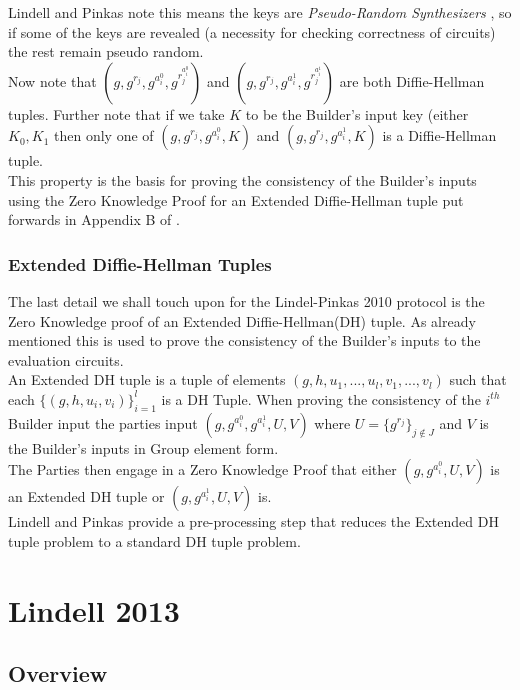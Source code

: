 \documentclass[ %
                    author={Nicholas Tutte},
                supervisor={Prof. Nigel Smart},
                    degree={MEng},
                     title={Secure Two Party Computation},
                  subtitle={A practical comparison of recent protocols},
                      type={Research - GG1K},
                      year={2015} ]{dissertation}
\begin{document}
				Lindell and Pinkas note this means the keys are \emph{Pseudo-Random Synthesizers} \cite{PseudoRandomSynth}, so if some of the keys are revealed (a necessity for checking correctness of circuits) the rest remain pseudo random.\\

				Now note that $(g, g^{r_j}, g^{a_i^0}, g^{r_j^{a_i^0}})$ and $(g, g^{r_j}, g^{a_i^1}, g^{r_j^{a_i^1}})$ are both Diffie-Hellman tuples. Further note that if we take $K$ to be the Builder's input key (either $K_0, K_1$  then only one of $(g, g^{r_j}, g^{a_i^0}, K)$ and $(g, g^{r_j}, g^{a_i^1}, K)$ is a Diffie-Hellman tuple.\\

				This property is the basis for proving the consistency of the Builder's inputs using the Zero Knowledge Proof for an Extended Diffie-Hellman tuple put forwards in Appendix B of \cite{LindellAndPinkas2011}.

				\subsubsection{Extended Diffie-Hellman Tuples}
					The last detail we shall touch upon for the Lindel-Pinkas 2010 protocol is the Zero Knowledge proof of an Extended Diffie-Hellman(DH) tuple. As already mentioned this is used to prove the consistency of the Builder's inputs to the evaluation circuits.\\

					An Extended DH tuple is a tuple of elements $(g, h, u_1, ..., u_l, v_1, ..., v_l)$ such that each $\{(g, h, u_i, v_i)\}_{i = 1}^{l}$ is a DH Tuple. When proving the consistency of the $i^{th}$ Builder input the parties input $(g, g^{a_i^0}, g^{a_i^1}, U, V)$ where $U = \{g^{r_j}\}_{j \notin J}$ and $V$ is the Builder's inputs in Group element form.\\

					The Parties then engage in a Zero Knowledge Proof that either $(g, g^{a_i^0}, U, V)$ is an Extended DH tuple or $(g, g^{a_i^1}, U, V)$ is.\\

					Lindell and Pinkas provide a pre-processing step that reduces the Extended DH tuple problem to a standard DH tuple problem. 


		\section{Lindell 2013}
			\subsection{Overview}
\end{document}

